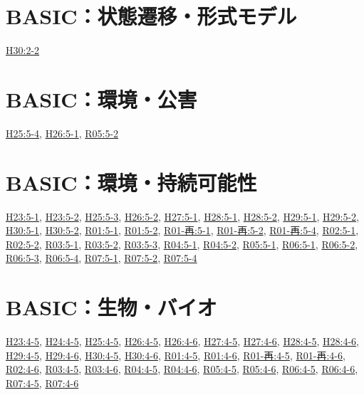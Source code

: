 \section{BASIC：状態遷移・形式モデル}
\hyperref[q:h30-reg-basic-2-2]{H30:2-2}
\section{BASIC：環境・公害}
\hyperref[q:h25-reg-basic-5-4]{H25:5-4}, \hyperref[q:h26-reg-basic-5-1]{H26:5-1}, \hyperref[q:r05-reg-basic-5-2]{R05:5-2}
\section{BASIC：環境・持続可能性}
\hyperref[q:h23-reg-basic-5-1]{H23:5-1}, \hyperref[q:h23-reg-basic-5-2]{H23:5-2}, \hyperref[q:h25-reg-basic-5-3]{H25:5-3}, \hyperref[q:h26-reg-basic-5-2]{H26:5-2}, \hyperref[q:h27-reg-basic-5-1]{H27:5-1}, \hyperref[q:h28-reg-basic-5-1]{H28:5-1}, \hyperref[q:h28-reg-basic-5-2]{H28:5-2}, \hyperref[q:h29-reg-basic-5-1]{H29:5-1}, \hyperref[q:h29-reg-basic-5-2]{H29:5-2}, \hyperref[q:h30-reg-basic-5-1]{H30:5-1}, \hyperref[q:h30-reg-basic-5-2]{H30:5-2}, \hyperref[q:r01-reg-basic-5-1]{R01:5-1}, \hyperref[q:r01-reg-basic-5-2]{R01:5-2}, \hyperref[q:r01-ret-basic-5-1]{R01-再:5-1}, \hyperref[q:r01-ret-basic-5-2]{R01-再:5-2}, \hyperref[q:r01-ret-basic-5-4]{R01-再:5-4}, \hyperref[q:r02-reg-basic-5-1]{R02:5-1}, \hyperref[q:r02-reg-basic-5-2]{R02:5-2}, \hyperref[q:r03-reg-basic-5-1]{R03:5-1}, \hyperref[q:r03-reg-basic-5-2]{R03:5-2}, \hyperref[q:r03-reg-basic-5-3]{R03:5-3}, \hyperref[q:r04-reg-basic-5-1]{R04:5-1}, \hyperref[q:r04-reg-basic-5-2]{R04:5-2}, \hyperref[q:r05-reg-basic-5-1]{R05:5-1}, \hyperref[q:r06-reg-basic-5-1]{R06:5-1}, \hyperref[q:r06-reg-basic-5-2]{R06:5-2}, \hyperref[q:r06-reg-basic-5-3]{R06:5-3}, \hyperref[q:r06-reg-basic-5-4]{R06:5-4}, \hyperref[q:r07-reg-basic-5-1]{R07:5-1}, \hyperref[q:r07-reg-basic-5-2]{R07:5-2}, \hyperref[q:r07-reg-basic-5-4]{R07:5-4}
\section{BASIC：生物・バイオ}
\hyperref[q:h23-reg-basic-4-5]{H23:4-5}, \hyperref[q:h24-reg-basic-4-5]{H24:4-5}, \hyperref[q:h25-reg-basic-4-5]{H25:4-5}, \hyperref[q:h26-reg-basic-4-5]{H26:4-5}, \hyperref[q:h26-reg-basic-4-6]{H26:4-6}, \hyperref[q:h27-reg-basic-4-5]{H27:4-5}, \hyperref[q:h27-reg-basic-4-6]{H27:4-6}, \hyperref[q:h28-reg-basic-4-5]{H28:4-5}, \hyperref[q:h28-reg-basic-4-6]{H28:4-6}, \hyperref[q:h29-reg-basic-4-5]{H29:4-5}, \hyperref[q:h29-reg-basic-4-6]{H29:4-6}, \hyperref[q:h30-reg-basic-4-5]{H30:4-5}, \hyperref[q:h30-reg-basic-4-6]{H30:4-6}, \hyperref[q:r01-reg-basic-4-5]{R01:4-5}, \hyperref[q:r01-reg-basic-4-6]{R01:4-6}, \hyperref[q:r01-ret-basic-4-5]{R01-再:4-5}, \hyperref[q:r01-ret-basic-4-6]{R01-再:4-6}, \hyperref[q:r02-reg-basic-4-6]{R02:4-6}, \hyperref[q:r03-reg-basic-4-5]{R03:4-5}, \hyperref[q:r03-reg-basic-4-6]{R03:4-6}, \hyperref[q:r04-reg-basic-4-5]{R04:4-5}, \hyperref[q:r04-reg-basic-4-6]{R04:4-6}, \hyperref[q:r05-reg-basic-4-5]{R05:4-5}, \hyperref[q:r05-reg-basic-4-6]{R05:4-6}, \hyperref[q:r06-reg-basic-4-5]{R06:4-5}, \hyperref[q:r06-reg-basic-4-6]{R06:4-6}, \hyperref[q:r07-reg-basic-4-5]{R07:4-5}, \hyperref[q:r07-reg-basic-4-6]{R07:4-6}
